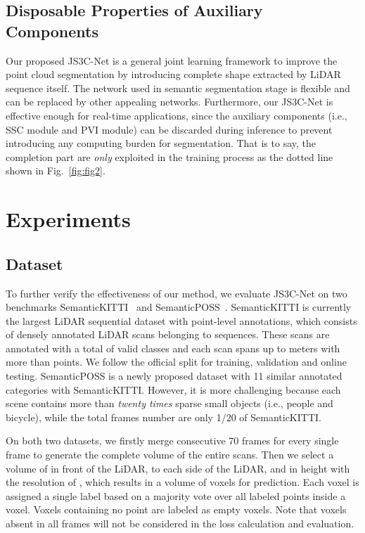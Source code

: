 \documentclass[letterpaper]{article} \usepackage{aaai21}  \usepackage{times}  \usepackage{helvet} \usepackage{courier}  \usepackage[hyphens]{url}  \usepackage{graphicx} \urlstyle{rm} \def\UrlFont{\rm}  \usepackage{natbib}  \usepackage{booktabs}
\begin{document}
	
    \subsection{Disposable Properties of Auxiliary Components}
    
	Our proposed JS3C-Net is a general joint learning framework to improve the point cloud segmentation by introducing complete shape extracted by LiDAR sequence itself. 
The network used in semantic segmentation stage is flexible and can be replaced by other appealing networks. 
Furthermore, our JS3C-Net is effective enough for real-time applications, since the auxiliary components (i.e., SSC module and PVI module) can be discarded during inference to prevent introducing any computing burden for segmentation.
That is to say, the completion part are \textit{only} exploited in the training process as the dotted line shown in Fig.~\ref{fig:fig2}.


	\section{Experiments}
	
	\subsection{Dataset}
	
	To further verify the effectiveness of our method, we evaluate JS3C-Net on two benchmarks SemanticKITTI~\cite{behley2019semantickitti} and SemanticPOSS~\cite{pan2020semanticposs}.
SemanticKITTI is currently the largest LiDAR sequential dataset with point-level annotations, which consists of  densely annotated LiDAR scans belonging to  sequences. These scans are annotated with a total of  valid classes and each scan spans up to  meters with more than  points.
We follow the official split for training, validation and online testing.
SemanticPOSS is a newly proposed dataset with 11 similar annotated categories with SemanticKITTI.
However, it is more challenging because each scene contains more than \textit{twenty times} sparse small objects (i.e., people and bicycle), while the total frames number are only 1/20 of SemanticKITTI.
	
    On both two datasets, we firstly merge consecutive 70 frames for every single frame to generate the complete volume of the entire scans. 
Then we select a volume of  in front of the LiDAR,  to each side of the LiDAR, and  in height with the resolution of , which results in a volume of  voxels for prediction. 
Each voxel is assigned a single label based on a majority vote over all labeled points inside a voxel. Voxels containing no point are labeled as empty voxels. 
Note that voxels absent in all frames will not be considered in the loss calculation and evaluation.
\end{document}

